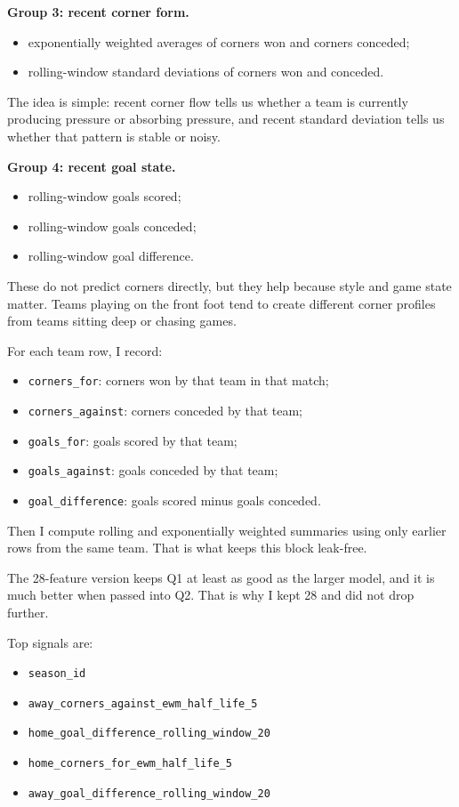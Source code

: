 \documentclass{article}
\begin{document}
\textbf{Group 3: recent corner form.}
\begin{itemize}
    \item exponentially weighted averages of corners won and corners conceded;
    \item rolling-window standard deviations of corners won and conceded.
\end{itemize}
The idea is simple: recent corner flow tells us whether a team is currently producing pressure or absorbing pressure, and recent standard deviation tells us whether that pattern is stable or noisy.

\textbf{Group 4: recent goal state.}
\begin{itemize}
    \item rolling-window goals scored;
    \item rolling-window goals conceded;
    \item rolling-window goal difference.
\end{itemize}
These do not predict corners directly, but they help because style and game state matter. Teams playing on the front foot tend to create different corner profiles from teams sitting deep or chasing games.

For each team row, I record:
\begin{itemize}
    \item \texttt{corners\_for}: corners won by that team in that match;
    \item \texttt{corners\_against}: corners conceded by that team;
    \item \texttt{goals\_for}: goals scored by that team;
    \item \texttt{goals\_against}: goals conceded by that team;
    \item \texttt{goal\_difference}: goals scored minus goals conceded.
\end{itemize}
Then I compute rolling and exponentially weighted summaries using only earlier rows from the same team. That is what keeps this block leak-free.

The 28-feature version keeps Q1 at least as good as the larger model, and it is much better when passed into Q2. That is why I kept 28 and did not drop further.

Top signals are:
\begin{itemize}
    \item \texttt{season\_id}
    \item \texttt{away\_corners\_against\_ewm\_half\_life\_5}
    \item \texttt{home\_goal\_difference\_rolling\_window\_20}
    \item \texttt{home\_corners\_for\_ewm\_half\_life\_5}
    \item \texttt{away\_goal\_difference\_rolling\_window\_20}
\end{itemize}
\end{document}

